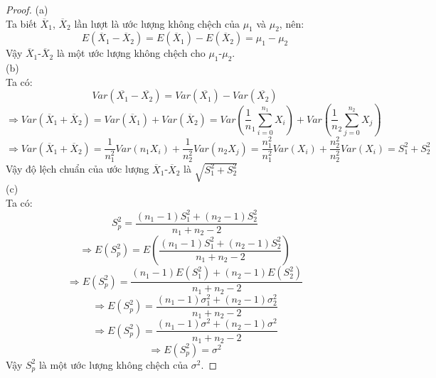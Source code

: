\begin{proof}
(a)\\
Ta biết $\overline{X}_1$, $\overline{X}_2$ lần lượt là ước lượng không chệch của $\mu_1$ và $\mu_2$, nên:
\begin{equation*}
{E(\overline{X}_1-\overline{X}_2) = E(\overline{X}_1)-E(\overline{X}_2) = \mu_1-\mu_2}
\end{equation*}
Vậy $\overline{X}_1$-$\overline{X}_2$ là một ước lượng không chệch cho $\mu_1$-$\mu_2$.\\
(b)\\
Ta có:
\begin{equation*}
Var(\overline{X_1}-\overline{X_2}) = Var(\overline{X_1})-Var(\overline{X_2})
\end{equation*}
\begin{equation*}
\Rightarrow Var(\overline{X}_1+\overline{X}_2) = Var(\overline{X}_1)+Var(\overline{X}_2) =  Var(\frac1n_1\sum_{i=0}^{n_1}X_i)+Var(\frac1n_2\sum_{j=0}^{n_2}X_j)
\end{equation*}
\begin{equation*}
\Rightarrow Var(\overline{X}_1+\overline{X}_2) = \frac{1}{n^2_1}Var(n_1X_i)+\frac{1}{n^2_2}Var(n_2X_j) = \frac{n^2_1}{n^2_1}Var(X_i)+\frac{n^2_2}{n^2_2}Var(X_i)= S^2_1 + S^2_2 
\end{equation*}
Vậy độ lệch chuẩn của ước lượng $\overline{X}_1$-$\overline{X}_2$ là $\sqrt{S^2_1 + S^2_2}$\\
(c)\\
Ta có:
\begin{equation*}
S^2_p = \dfrac{(n_1-1)S^2_1+(n_2-1)S^2_2}{n_1+n_2-2}
\end{equation*}
\begin{equation*}
\Rightarrow E(S^2_p) = E(\dfrac{(n_1-1)S^2_1+(n_2-1)S^2_2}{n_1+n_2-2})
\end{equation*}
\begin{equation*}
\Rightarrow E(S^2_p) = \dfrac{(n_1-1)E(S^2_1)+(n_2-1)E(S^2_2)}{n_1+n_2-2}
\end{equation*}
\begin{equation*}
\Rightarrow E(S^2_p) = \dfrac{(n_1-1)\sigma_1^2+(n_2-1)\sigma_2^2}{n_1+n_2-2}
\end{equation*}
\begin{equation*}
\Rightarrow E(S^2_p) = \dfrac{(n_1-1)\sigma^2+(n_2-1)\sigma^2}{n_1+n_2-2} 
\end{equation*}
\begin{equation*}
\Rightarrow E(S^2_p) = \sigma^2
\end{equation*}
Vậy $S^2_p$ là một ước lượng không chệch của  $\sigma^2$.
\end{proof}
